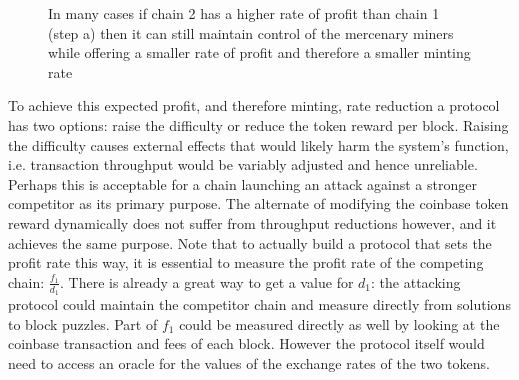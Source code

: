\documentclass[10pt, preprint]{aastex}
\begin{document}
\begin{figure}
\caption{In many cases if chain 2 has a higher rate of profit than chain 1 (step a) then it can still maintain control of the mercenary miners while offering a smaller rate of profit and therefore a smaller minting rate }
\end{figure}


To achieve this expected profit, and therefore minting, rate reduction a protocol has two options: raise the difficulty or reduce the token reward per block.  Raising the difficulty causes external effects that would likely harm the system's function, i.e. transaction throughput would be variably adjusted and hence unreliable.  Perhaps this is acceptable for a chain launching an attack against a stronger competitor as its primary purpose.  The alternate of modifying the coinbase token reward dynamically does not suffer from throughput reductions however, and it achieves the same purpose.  Note that to actually build a protocol that sets the profit rate this way, it is essential to measure the profit rate of the competing chain: $\frac{f_1}{d_1}$.  There is already a great way to get a value for $d_1$: the attacking protocol could maintain the competitor chain and measure directly from solutions to block puzzles.  Part of $f_1$ could be measured directly as well by looking at the coinbase transaction and fees of each block.  However the protocol itself would need to access an oracle for the values of the exchange rates of the two tokens.
\end{document}
